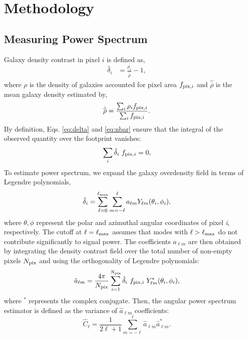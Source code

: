 \section{Methodology}


\subsection{Measuring Power Spectrum}
Galaxy density contrast in pixel $i$ is defined as,
\begin{align}\label{eq:delta}
    \hat{\delta}_{i} &= \frac{\rho_{i}}{\hat{\overline{\rho}}} - 1 ,
\end{align}
where $\rho$ is the density of galaxies accounted for pixel area $f_{{\rm pix},i}$ and $\hat{\overline{\rho}}$ is the mean galaxy density estimated by,
\begin{equation}\label{eq:nbar}
\hat{\overline{\rho}} = \frac{\sum_{i}\rho_{i}f_{{\rm pix},i}}{\sum_{i}f_{{\rm pix},i}}.
\end{equation}
By definition, Eqs. \ref{eq:delta} and \ref{eq:nbar} ensure that the integral of the observed quantity over the footprint vanishes:
\begin{align}\label{eq:ic}
    \sum_{i} \hat{\delta}_{i}~f_{{\rm pix},i} = 0,
\end{align}
To estimate power spectrum, we expand the galaxy overdensity field in terms of Legendre polynomials,
\begin{equation}
        \hat{\delta}_{i} = \sum_{\ell=0}^{\ell_{{\rm max}}}\sum_{m=-\ell}^{\ell} a_{\ell m} Y_{\ell m}(\theta_{i}, \phi_{i}),
\end{equation}
where $\theta, \phi$ represent the polar and azimuthal angular coordinates of pixel \textit{i}, respectively. The cutoff at $\ell=\ell_{{\rm max}}$ assumes that modes with $\ell>\ell_{{\rm max}}$ do not contribute significantly to signal power. The  coefficients $a_{\ell m}$ are then obtained by integrating the density contrast field over the total number of non-empty pixels $N_{{\rm pix}}$ and using the orthogonality of Legendre polynomials:
\begin{equation}
        \hat{a}_{\ell m} = \frac{4\pi}{N_{{\rm pix}}} \sum_{i=1}^{N_{{\rm pix}}}  \hat{\delta}_{i}~f_{\rm pix, i}~ Y^{*}_{\ell m}(\theta_{i}, \phi_{i}),
\end{equation}
where $^{*}$ represents the complex conjugate. Then, the angular power spectrum estimator is defined as the variance of  $\hat{a}_{\ell m}$  coefficients:
\begin{equation}\label{eq:pusedocell}
        \hat{C}_{\ell} = \frac{1}{2\ell +1} \sum_{m=-\ell}^{\ell} \hat{a}_{\ell m} \hat{a}^{*}_{\ell m}.
\end{equation}

